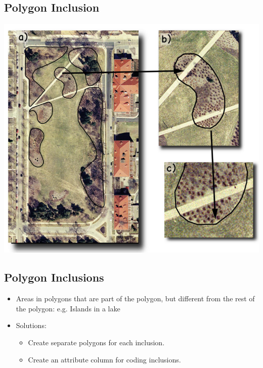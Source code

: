 \documentclass[11pt]{article}
\theoremstyle{definition}
\begin{document}
\subsection{Polygon Inclusion}
\includegraphics[width=\textwidth/3]{26.png}

\subsection{Polygon Inclusions}
\begin{itemize}
    \item Areas in polygons that are part of the
    polygon, but different from the rest of the
    polygon: e.g. Islands in a lake
    \item Solutions:
    \begin{itemize}
        \item Create separate polygons for each inclusion.
        \item Create an attribute column for coding
        inclusions.
    \end{itemize}
\end{itemize}
\end{document}
